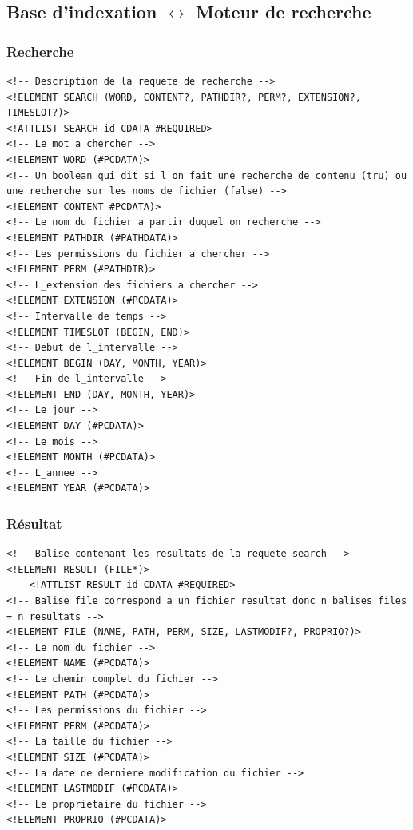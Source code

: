 \newpage
\subsection{Base d'indexation $\leftrightarrow$ Moteur de recherche}

\subsubsection{Recherche}\label{dtd_bi_mr_search}
\begin{lstlisting}[frame=single]
<!-- Description de la requete de recherche -->
<!ELEMENT SEARCH (WORD, CONTENT?, PATHDIR?, PERM?, EXTENSION?, TIMESLOT?)>
<!ATTLIST SEARCH id CDATA #REQUIRED>
<!-- Le mot a chercher -->
<!ELEMENT WORD (#PCDATA)>
<!-- Un boolean qui dit si l_on fait une recherche de contenu (tru) ou une recherche sur les noms de fichier (false) -->
<!ELEMENT CONTENT #PCDATA)>
<!-- Le nom du fichier a partir duquel on recherche -->
<!ELEMENT PATHDIR (#PATHDATA)>
<!-- Les permissions du fichier a chercher -->
<!ELEMENT PERM (#PATHDIR)>
<!-- L_extension des fichiers a chercher -->
<!ELEMENT EXTENSION (#PCDATA)>
<!-- Intervalle de temps -->
<!ELEMENT TIMESLOT (BEGIN, END)>
<!-- Debut de l_intervalle -->
<!ELEMENT BEGIN (DAY, MONTH, YEAR)>
<!-- Fin de l_intervalle -->
<!ELEMENT END (DAY, MONTH, YEAR)>
<!-- Le jour -->
<!ELEMENT DAY (#PCDATA)>
<!-- Le mois -->
<!ELEMENT MONTH (#PCDATA)>
<!-- L_annee -->
<!ELEMENT YEAR (#PCDATA)>
\end{lstlisting}

\subsubsection{Résultat}\label{dtd_bi_mr_result}
\begin{lstlisting}[frame=single]
<!-- Balise contenant les resultats de la requete search -->
<!ELEMENT RESULT (FILE*)>
	<!ATTLIST RESULT id CDATA #REQUIRED>
<!-- Balise file correspond a un fichier resultat donc n balises files = n resultats -->
<!ELEMENT FILE (NAME, PATH, PERM, SIZE, LASTMODIF?, PROPRIO?)>
<!-- Le nom du fichier -->
<!ELEMENT NAME (#PCDATA)>
<!-- Le chemin complet du fichier -->
<!ELEMENT PATH (#PCDATA)>
<!-- Les permissions du fichier -->
<!ELEMENT PERM (#PCDATA)>
<!-- La taille du fichier -->
<!ELEMENT SIZE (#PCDATA)>
<!-- La date de derniere modification du fichier -->
<!ELEMENT LASTMODIF (#PCDATA)>
<!-- Le proprietaire du fichier -->
<!ELEMENT PROPRIO (#PCDATA)>
\end{lstlisting}


